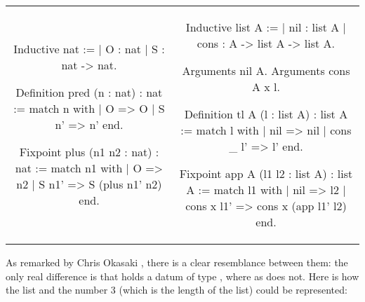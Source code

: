 \documentclass{article}
\newenvironment{no_padding_center}
    {\parskip=0pt\par\nopagebreak\centering}
    {\par\noindent}
\begin{document}
\begin{no_padding_center}
    \begin{tabular}{c c}
        \begin{coq}
Inductive nat :=
  | O : nat
  | S : nat -> nat.




Definition pred (n : nat) : nat :=
  match n with
  | O => O
  | S n' => n'
  end.

Fixpoint plus (n1 n2 : nat) : nat :=
  match n1 with
  | O => n2
  | S n1' => S (plus n1' n2)
  end.
        \end{coq} &
        \begin{coq}
Inductive list A :=
  | nil : list A
  | cons : A -> list A -> list A.

Arguments nil {A}.
Arguments cons {A} x l.

Definition tl {A} (l : list A) : list A :=
  match l with
  | nil => nil
  | cons _ l' => l'
  end.

Fixpoint app {A} (l1 l2 : list A) : list A :=
  match l1 with
  | nil => l2
  | cons x l1' => cons x (app l1' l2)
  end.
        \end{coq}
    \end{tabular}
\end{no_padding_center}

As remarked by Chris Okasaki \cite{okasaki_1998}, there is a clear resemblance between them: the only real difference is that  holds a datum of type , where as  does not. Here is how the list \coqinline{[7; 5; 8]} and the number 3 (which is the length of the list) could be represented:
\end{document}
